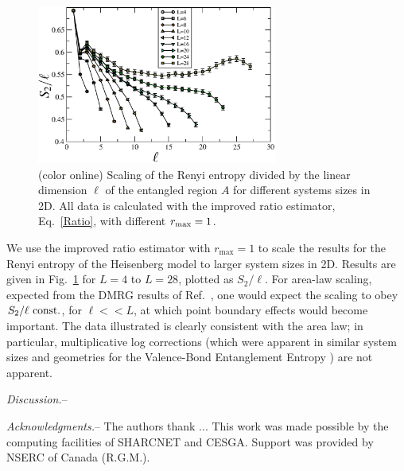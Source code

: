 \documentclass[prl,aps,twocolumn,floatfix,amsmath,amssymb,superscriptaddress,tightenlines]{revtex4}
\begin{document}
\begin{figure} {
\includegraphics[width=3.1in]{fig4.eps} \caption{(color online) 
\label{fig4}
Scaling of the Renyi entropy divided by the linear dimension $\ell$ of the entangled region $A$ for different systems sizes
in 2D.  All data is calculated with the improved ratio estimator, Eq.~\eqref{Ratio}, with different $r_{\rm max}=1$.  
}
} \end{figure}

We use the improved ratio estimator with $r_{\max}=1$ to scale the results for the Renyi entropy of the Heisenberg model to larger system sizes in 2D.  Results are given in Fig.~\ref{fig4} for $L=4$ to $L=28$, plotted as $S_2/\ell$.  For area-law scaling, expected from the DMRG results of Ref.~\cite{Ann}, one would expect the scaling to obey $S_2/\ell ~ {\rm const.}$, for $\ell<<L$, at which point boundary effects would become important.  The data illustrated is clearly consistent with the area law; in particular, multiplicative log corrections (which were apparent in similar system sizes and geometries for the Valence-Bond Entanglement Entropy
\cite{Alet,Chh}) are not apparent.

{\it Discussion.}-- 



{\it Acknowledgments.}-- The authors thank ...
This work was made possible by the
computing facilities of SHARCNET and CESGA.  Support was provided by NSERC
of Canada (R.G.M.).


\end{document}
